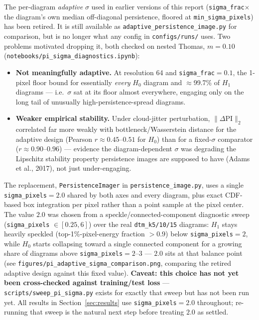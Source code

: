 \documentclass[11pt]{article}
\begin{document}
The per-diagram \emph{adaptive} $\sigma$ used in earlier versions of this
report (\texttt{sigma\_frac}$\times$the diagram's own median off-diagonal
persistence, floored at \texttt{min\_sigma\_pixels}) has been retired. It is
still available as \texttt{adaptive\_persistence\_image.py} for comparison,
but is no longer what any config in \texttt{configs/runs/} uses. Two problems
motivated dropping it, both checked on nested Thomas, $m=0.10$
(\texttt{notebooks/pi\_sigma\_diagnostics.ipynb}):

\begin{itemize}
  \item \textbf{Not meaningfully adaptive.} At resolution 64 and
    \texttt{sigma\_frac}$=0.1$, the 1-pixel floor bound for essentially
    \emph{every} $H_0$ diagram and $\approx$99.7\% of $H_1$ diagrams — i.e.\
    $\sigma$ sat at its floor almost everywhere, engaging only on the long
    tail of unusually high-persistence-spread diagrams.
  \item \textbf{Weaker empirical stability.} Under cloud-jitter perturbation,
    $\|\Delta\text{PI}\|_2$ correlated far more weakly with
    bottleneck/Wasserstein distance for the adaptive design (Pearson
    $r\approx0.45$--$0.51$ for $H_0$) than for a fixed-$\sigma$ comparator
    ($r\approx0.90$--$0.96$) — evidence the diagram-dependent $\sigma$ was
    degrading the Lipschitz stability property persistence images are
    supposed to have (Adams et al., 2017), not just under-engaging.
\end{itemize}

The replacement, \texttt{PersistenceImager} in \texttt{persistence\_image.py},
uses a single \texttt{sigma\_pixels}$=2.0$ shared by both axes and every
diagram, plus exact CDF-based box integration per pixel rather than a point
sample at the pixel center. The value $2.0$ was chosen from a
speckle/connected-component diagnostic sweep (\texttt{sigma\_pixels}
$\in[0.25,6]$) over the real \texttt{dtm\_k5/10/15} diagrams: $H_1$ stays
heavily speckled (top-1\%-pixel-energy fraction $>0.9$) below
\texttt{sigma\_pixels}$=2$, while $H_0$ starts collapsing toward a single
connected component for a growing share of diagrams above
\texttt{sigma\_pixels}$=2$--$3$ — $2.0$ sits at that balance point (see
\texttt{figures/pi\_adaptive\_sigma\_comparison.png}, comparing the retired
adaptive design against this fixed value). \textbf{Caveat: this choice has
not yet been cross-checked against training/test loss} —
\texttt{scripts/sweep\_pi\_sigma.py} exists for exactly that sweep but has not
been run yet. All results in Section~\ref{sec:results} use
\texttt{sigma\_pixels}$=2.0$ throughout; re-running that sweep is the natural
next step before treating $2.0$ as settled.
\end{document}
